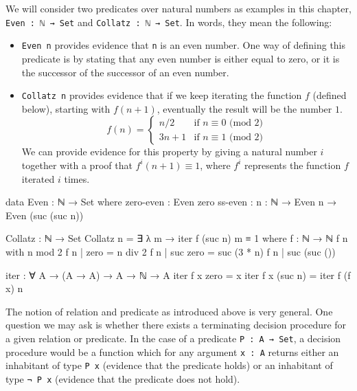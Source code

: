We will consider two predicates over natural numbers as examples in this chapter, \texttt{Even : ℕ → Set} and \texttt{Collatz : ℕ → Set}. In words, they mean the following:
\begin{itemize}
\item \texttt{Even n} provides evidence that \texttt{n} is an even number. One way of defining this predicate is by stating that any even number is either equal to zero, or it is the successor of the successor of an even number.
\item \texttt{Collatz n} provides evidence that if we keep iterating the function \(f\) (defined below), starting with \(f (n + 1)\), eventually the result will be the number \(1\).
\[ f(n) =
	\begin{cases}
		n/2    & \text{if } n \equiv 0 \text{ (mod \(2\))} \\
		3n + 1 & \text{if } n \equiv 1 \text{ (mod \(2\))}
	\end{cases}
\]
We can provide evidence for this property by giving a natural number \(i\) together with a proof that \(f^i(n+1) \equiv 1\), where \(f^i\) represents the function \(f\) iterated \(i\) times.
\end{itemize}

\begin{listing}[h]
\begin{agdacode}
data Even : ℕ → Set where
  zero-even : Even zero
  ss-even   : {n : ℕ} → Even n → Even (suc (suc n))
\end{agdacode}
\end{listing}

\begin{listing}[h]
\begin{agdacode}
Collatz : ℕ → Set
Collatz n = ∃ λ m → iter f (suc n) m ≡ 1
  where
    f : ℕ → ℕ
    f n with n mod 2
    f n | zero     = n div 2
    f n | suc zero = suc (3 * n)
    f n | suc (suc ())

    iter : ∀ {A} → (A → A) → A → ℕ → A
    iter f x zero    = x
    iter f x (suc n) = iter f (f x) n
\end{agdacode}
\end{listing}


The notion of relation and predicate as introduced above is very general. One question we may ask is whether there exists a terminating decision procedure for a given relation or predicate. In the case of a predicate \texttt{P : A → Set}, a decision procedure would be a function which for any argument \texttt{x : A} returns either an inhabitant of type \texttt{P x} (evidence that the predicate holds) or an inhabitant of type \texttt{¬ P x} (evidence that the predicate does not hold).


